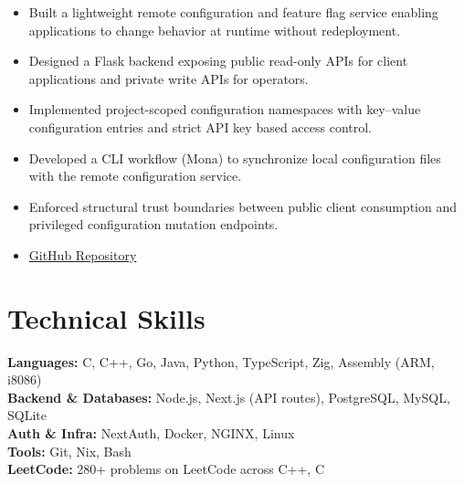 \documentclass[a4paper,10pt]{article}
\begin{document}
\begin{itemize}[noitemsep, topsep=2pt]
    \item Built a lightweight remote configuration and feature flag service enabling applications to change behavior at runtime without redeployment.
    \item Designed a Flask backend exposing public read-only APIs for client applications and private write APIs for operators.
    \item Implemented project-scoped configuration namespaces with key–value configuration entries and strict API key based access control.
    \item Developed a CLI workflow (Mona) to synchronize local configuration files with the remote configuration service.
    \item Enforced structural trust boundaries between public client consumption and privileged configuration mutation endpoints.
    \item \href{https://github.com/haibaaa/lisa}{GitHub Repository}
\end{itemize}

\section*{Technical Skills}

\textbf{Languages:} C, C++, Go, Java, Python, TypeScript, Zig, Assembly (ARM, i8086) \\
\textbf{Backend \& Databases:} Node.js, Next.js (API routes), PostgreSQL, MySQL, SQLite \\
\textbf{Auth \& Infra:} NextAuth, Docker, NGINX, Linux \\
\textbf{Tools:} Git, Nix, Bash \\
\textbf{LeetCode:} 280+ problems on LeetCode across C++, C \\
\end{document}

